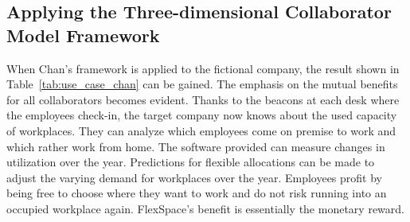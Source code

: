 	\subsection{Applying the Three-dimensional Collaborator Model Framework}
	\vspace{-1em}
			When  Chan's framework is applied to the fictional company, the result shown in Table~\ref{tab:use_case_chan} can be gained. The emphasis on the mutual benefits for all collaborators becomes evident. Thanks to the beacons at each desk where the employees check-in, the target company now knows about the used capacity of workplaces. They can analyze which employees come on premise to work and which rather work from home. The software provided can measure changes in utilization over the year. Predictions for flexible allocations can be made to adjust the varying demand for workplaces over the year. Employees profit by being free to choose where they want to work and do not risk running into an occupied workplace again. FlexSpace's benefit is essentially the monetary reward.
